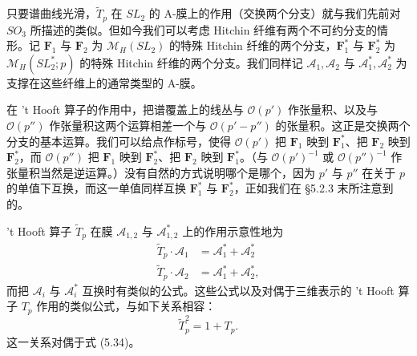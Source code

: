\documentclass[11pt,a4paper]{article}
\begin{document}

只要谱曲线光滑，$\widetilde{T}_p$ 在 $SL_2$ 的 A-膜上的作用（交换两个分支）就与我们先前对 $SO_3$ 所描述的类似。但如今我们可以考虑 Hitchin 纤维有两个不可约分支的情形。记 $\boldsymbol{F}_1$ 与 $\boldsymbol{F}_2$ 为 $\mathcal{M}_H(SL_2)$ 的特殊 Hitchin 纤维的两个分支，$\boldsymbol{F}_1^*$ 与 $\boldsymbol{F}_2^*$ 为 $\mathcal{M}_H(SL_2^*;p)$ 的特殊 Hitchin 纤维的两个分支。我们同样记 $\mathcal{A}_1,\mathcal{A}_2$ 与 $\mathcal{A}_1^*,\mathcal{A}_2^*$ 为支撑在这些纤维上的通常类型的 A-膜。

在 't Hooft 算子的作用中，把谱覆盖上的线丛与 $\mathcal{O}(p')$ 作张量积、以及与 $\mathcal{O}(p'')$ 作张量积这两个运算相差一个与 $\mathcal{O}(p'-p'')$ 的张量积。这正是交换两个分支的基本运算。我们可以给点作标号，使得 $\mathcal{O}(p')$ 把 $\boldsymbol{F}_1$ 映到 $\boldsymbol{F}_1^*$、把 $\boldsymbol{F}_2$ 映到 $\boldsymbol{F}_2^*$，而 $\mathcal{O}(p'')$ 把 $\boldsymbol{F}_1$ 映到 $\boldsymbol{F}_2^*$、把 $\boldsymbol{F}_2$ 映到 $\boldsymbol{F}_1^*$。（与 $\mathcal{O}(p')^{-1}$ 或 $\mathcal{O}(p'')^{-1}$ 作张量积当然是逆运算。）没有自然的方式说明哪个是哪个，因为 $p'$ 与 $p''$ 在关于 $p$ 的单值下互换，而这一单值同样互换 $\boldsymbol{F}_1^*$ 与 $\boldsymbol{F}_2^*$，正如我们在 §5.2.3 末所注意到的。

't Hooft 算子 $\widetilde{T}_p$ 在膜 $\mathcal{A}_{1,2}$ 与 $\mathcal{A}_{1,2}^*$ 上的作用示意性地为
\begin{equation}\tag{5.38}
\begin{aligned}
\widetilde{T}_p\cdot\mathcal{A}_1 &= \mathcal{A}_1^*+\mathcal{A}_2^*\\
\widetilde{T}_p\cdot\mathcal{A}_2 &= \mathcal{A}_1^*+\mathcal{A}_2^*,
\end{aligned}
\end{equation}
而把 $\mathcal{A}_i$ 与 $\mathcal{A}_i^*$ 互换时有类似的公式。这些公式以及对偶于三维表示的 't Hooft 算子 $T_p$ 作用的类似公式，与如下关系相容：
\begin{equation}\tag{5.39}
\widetilde{T}_p^2=1+T_p.
\end{equation}
这一关系对偶于式 (5.34)。
\end{document}
